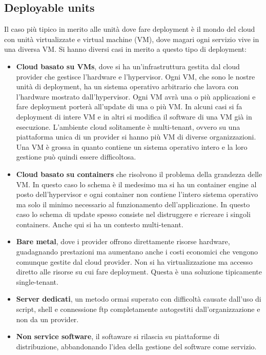 \subsection{Deployable units}
Il caso più tipico in merito alle unità dove fare deployment è il mondo del cloud
con unità virtualizzate e virtual machine (VM), dove magari ogni servizio vive in
una diversa VM. Si hanno diversi casi in merito a questo tipo di deployment:
\begin{itemize}
      \item \textbf{Cloud basato su VMs}, dove si ha un'infrastruttura gestita dal
            cloud provider che gestisce l'hardware e l'hypervisor. Ogni VM, che sono le
            nostre unità di deployment, ha un sistema operativo arbitrario che lavora con
            l'hardware mostrato dall'hypervisor. Ogni VM avrà una o più applicazioni e
            fare deployment porterà all'update di una o più VM. In alcuni casi si fa
            deployment di intere VM e in altri si modifica il software di una VM già
            in esecuzione. L'ambiente cloud solitamente è multi-tenant, ovvero su una
            piattaforma unica di un provider si hanno più VM di diverse organizzazioni.
            Una VM è grossa in quanto contiene un sistema operativo intero e la loro
            gestione può quindi essere difficoltosa.
      \item \textbf{Cloud basato su containers} che risolvono il problema della
            grandezza delle VM. In questo caso lo schema è il medesimo ma si ha un container
            engine al posto dell'hypervisor e ogni container non contiene l'intero sistema
            operativo ma solo il minimo necessario al funzionamento dell'applicazione. In
            questo caso lo schema di update spesso consiste nel distruggere e ricreare
            i singoli containers. Anche qui si ha un contesto multi-tenant.
      \item \textbf{Bare metal}, dove i provider offrono direttamente risorse
            hardware, guadagnando prestazioni ma aumentano anche i costi economici
            che vengono comunque gestite dal cloud provider. Non si ha virtualizzazione
            ma accesso diretto alle risorse su cui fare deployment. Questa è una soluzione
            tipicamente single-tenant.
      \item \textbf{Server dedicati}, un metodo ormai superato con difficoltà causate
            dall'uso di script, shell e connessione ftp completamente autogestiti
            dall'organizzazione e non da un provider.
      \item \textbf{Non service software}, il softaware si rilascia su piattaforme 
            di distribuzione, abbandonando l'idea della gestione del software
            come servizio.
\end{itemize}

